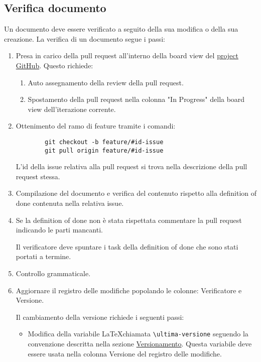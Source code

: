 \documentclass[a4paper, 12pt]{article}
\def\ultima-versione{v0.1}
\begin{document}
\subsection{Verifica documento}
\label{subsec:ver}
Un documento deve essere verificato a seguito della sua modifica o della sua creazione.
La verifica di un documento segue i passi:
\begin{enumerate}
    \item Presa in carico della pull request all'interno della board view del \href{https://github.com/orgs/ALT-F4-eng/projects}{project GitHub}.
    Questo richiede:
    \begin{enumerate}
        \item Auto assegnamento della review della pull request.
        \item Spostamento della pull request nella colonna "In Progress" della board view dell'iterazione corrente.
    \end{enumerate}
    
    \item Ottenimento del ramo di feature tramite i comandi:
    \begin{lstlisting}
        git checkout -b feature/#id-issue
        git pull origin feature/#id-issue
    \end{lstlisting}
    L'id della issue relativa alla pull request si trova nella descrizione della pull request stessa.

    \item Compilazione del documento e verifica del contenuto rispetto alla definition of done contenuta nella relativa issue.
    
    \item Se la definition of done non è stata rispettata commentare la pull request indicando le parti mancanti.
    
    Il verificatore deve spuntare i task della definition of done che sono stati portati a termine.
    
    \item Controllo grammaticale.
    
    \item Aggiornare il registro delle modifiche popolando le colonne: Verificatore e Versione.
    
    Il cambiamento della versione richiede i seguenti passi:
    \begin{itemize}
        \item Modifica della variabile \LaTeX \space chiamata \lstinline|\ultima-versione| seguendo la convenzione descritta nella sezione \hyperref[subsec:vers]{Versionamento}.
        Questa variabile deve essere usata nella colonna Versione del registro delle modifiche.


\end{itemize}
\end{enumerate}
\end{document}
